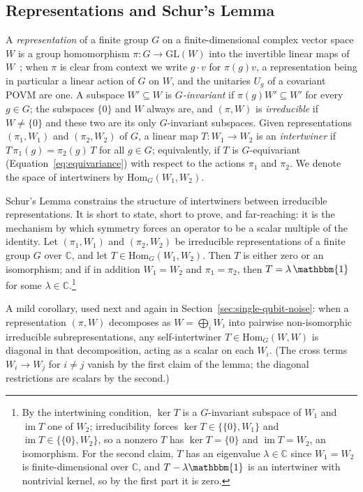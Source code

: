 \documentclass[11pt, oneside, openany]{scrbook}
\newcommand{\Id}{\mathbbm{1}}
\begin{document}
\subsection{Representations and Schur's Lemma} \label{subsec:schur}

A \textit{representation} of a finite group $G$ on a finite-dimensional complex vector space $W$ is a group homomorphism $\pi: G \rightarrow \mathrm{GL}(W)$ into the invertible linear maps of $W$~\cite{serre1977linearrepresentationsfinite}; when $\pi$ is clear from context we write $g \cdot v$ for $\pi(g) v$, a representation being in particular a linear action of $G$ on $W$, and the unitaries $U_g$ of a covariant POVM are one. A subspace $W' \subseteq W$ is \textit{$G$-invariant} if $\pi(g) W' \subseteq W'$ for every $g \in G$; the subspaces $\{0\}$ and $W$ always are, and $(\pi, W)$ is \textit{irreducible} if $W \neq \{0\}$ and these two are its only $G$-invariant subspaces. Given representations $(\pi_1, W_1)$ and $(\pi_2, W_2)$ of $G$, a linear map $T: W_1 \rightarrow W_2$ is an \textit{intertwiner} if $T\, \pi_1(g) = \pi_2(g)\, T$ for all $g \in G$; equivalently, if $T$ is $G$-equivariant (Equation~\eqref{eq:equivariance}) with respect to the actions $\pi_1$ and $\pi_2$. We denote the space of intertwiners by $\mathrm{Hom}_G(W_1, W_2)$.

Schur's Lemma constrains the structure of intertwiners between irreducible representations. It is short to state, short to prove, and far-reaching: it is the mechanism by which symmetry forces an operator to be a scalar multiple of the identity. Let $(\pi_1, W_1)$ and $(\pi_2, W_2)$ be irreducible representations of a finite group $G$ over $\mathbb{C}$, and let $T \in \mathrm{Hom}_G(W_1, W_2)$. Then $T$ is either zero or an isomorphism; and if in addition $W_1 = W_2$ and $\pi_1 = \pi_2$, then $T = \lambda\, \Id$ for some $\lambda \in \mathbb{C}$.\footnote{By the intertwining condition, $\ker T$ is a $G$-invariant subspace of $W_1$ and $\operatorname{im} T$ one of $W_2$; irreducibility forces $\ker T \in \{ \{0\}, W_1 \}$ and $\operatorname{im} T \in \{ \{0\}, W_2 \}$, so a nonzero $T$ has $\ker T = \{0\}$ and $\operatorname{im} T = W_2$, an isomorphism. For the second claim, $T$ has an eigenvalue $\lambda \in \mathbb{C}$ since $W_1 = W_2$ is finite-dimensional over $\mathbb{C}$, and $T - \lambda \Id$ is an intertwiner with nontrivial kernel, so by the first part it is zero.}

A mild corollary, used next and again in Section~\ref{sec:single-qubit-noise}: when a representation $(\pi, W)$ decomposes as $W = \bigoplus_i W_i$ into pairwise non-isomorphic irreducible subrepresentations, any self-intertwiner $T \in \mathrm{Hom}_G(W, W)$ is diagonal in that decomposition, acting as a scalar on each $W_i$. (The cross terms $W_i \to W_j$ for $i \neq j$ vanish by the first claim of the lemma; the diagonal restrictions are scalars by the second.)
\end{document}
